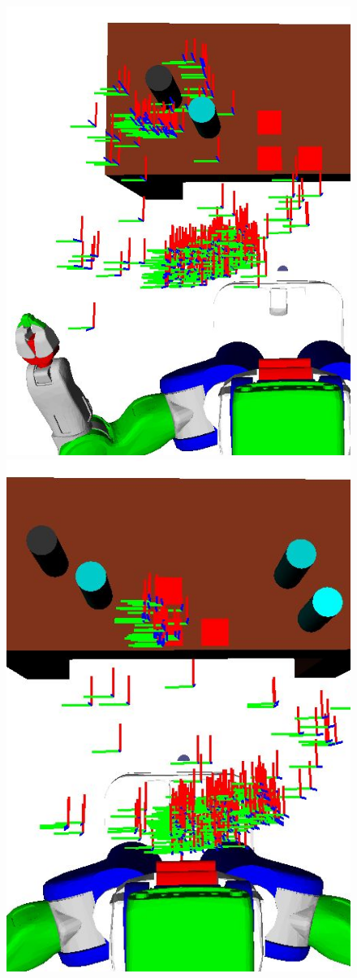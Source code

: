 \begin{figure}[h]
  \centering
    \noindent
    \includegraphics[scale=0.2]{images/move_grasp.png}\hspace{10 mm}
    \includegraphics[scale=0.2]{images/move_putdown.png}

\end{figure}

